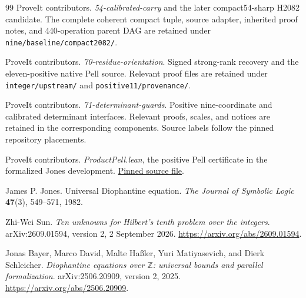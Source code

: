 \documentclass[11pt,a4paper]{article}
\newcommand{\file}[1]{\nolinkurl{#1}}
\theoremstyle{definition}
\theoremstyle{remark}
\numberwithin{equation}{section}
\begin{document}
\begin{thebibliography}{99}
ProveIt contributors.
\emph{54-calibrated-carry} and the later compact54-sharp H2082 candidate.
The complete coherent compact tuple, source adapter, inherited proof
notes, and 440-operation parent DAG are retained under
\file{nine/baseline/compact2082/}.

ProveIt contributors.
\emph{70-residue-orientation}.
Signed strong-rank recovery and the eleven-positive native Pell source.
Relevant proof files are retained under \file{integer/upstream/}
and \file{positive11/provenance/}.

ProveIt contributors.
\emph{71-determinant-guards}.
Positive nine-coordinate and calibrated determinant interfaces.
Relevant proofs, scales, and notices are retained in the corresponding
components. Source labels follow the pinned repository placements.

ProveIt contributors.
\emph{ProductPell.lean}, the positive Pell certificate in the formalized
Jones development.
\href{https://github.com/VladimirReshetnikov/ProveIt/blob/c1a102936aca437e9999530a0111e6ddab56dc6d/Computability/HilbertTenthProblem/Lean/Diophantine/Paper1982/ProductPell.lean}{Pinned source file}.

James P. Jones.
Universal Diophantine equation.
\emph{The Journal of Symbolic Logic} \textbf{47}(3), 549--571, 1982.

Zhi-Wei Sun.
\emph{Ten unknowns for Hilbert's tenth problem over the integers}.
arXiv:2609.01594, version 2, 2 September 2026.
\url{https://arxiv.org/abs/2609.01594}.

Jonas Bayer, Marco David, Malte Ha{\ss}ler, Yuri Matiyasevich,
and Dierk Schleicher.
\emph{Diophantine equations over \(\mathbb Z\): universal bounds and
parallel formalization}. arXiv:2506.20909, version 2, 2025.
\url{https://arxiv.org/abs/2506.20909}.
\end{thebibliography}
\end{document}
